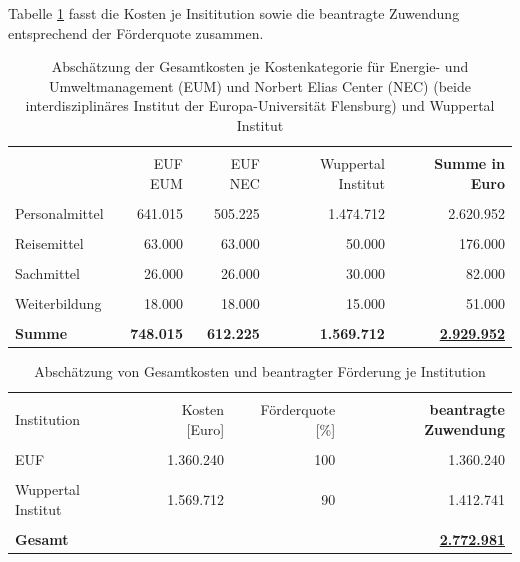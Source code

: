 \documentclass[a4paper,11pt,twoside]{scrartcl}
\begin{document}
Tabelle \ref{tab:kostenkalkulation} fasst die Kosten je Insititution sowie die beantragte Zuwendung entsprechend der Förderquote zusammen.

\begin{table}[h]
\begin{center}
  \caption{Abschätzung der Gesamtkosten je Kostenkategorie für Energie- und Umweltmanagement (EUM) und Norbert Elias Center (NEC) (beide interdisziplinäres Institut der Europa-Universität Flensburg) und Wuppertal Institut}
  
\begin{tabular}[h]{|l | r | r | r | r|}
\hline
&&&&\\
& EUF EUM & EUF NEC & Wuppertal Institut & \textbf{Summe in Euro}\\
\hline
\hline
&&&&\\
 Personalmittel & 641.015 & 505.225 & 1.474.712 & 2.620.952\\
 \hline
 &&&&\\
 Reisemittel & 63.000 & 63.000 & 50.000 & 176.000\\
 \hline
 &&&&\\
 Sachmittel & 26.000 & 26.000 & 30.000 & 82.000\\
 \hline
 &&&&\\
 Weiterbildung & 18.000 & 18.000 & 15.000 & 51.000\\
 \hline
 \hline
 &&&&\\
 \textbf{Summe}& \textbf{748.015} & \textbf{612.225} & \textbf{1.569.712} & \underline{\textbf{2.929.952}}\\
 \hline
 \end{tabular}
 \label{tab:kostenkalkulation}
\end{center}
\end{table}

\begin{table}[h]
\begin{center}
  \caption{Abschätzung von Gesamtkosten und beantragter Förderung je Institution}
\begin{tabular}[h]{|l | r | r | r|}
\hline
&&&\\
Institution & Kosten [Euro] & Förderquote [\%] & \textbf{beantragte Zuwendung}\\
\hline
\hline
 &&&\\
 EUF & 1.360.240 & 100 & 1.360.240\\
 \hline
 &&&\\
 Wuppertal Institut & 1.569.712 & 90 & 1.412.741

\\
 \hline
 \hline
 &&&\\
 \textbf{Gesamt} & & &\underline{\textbf{2.772.981}}\\
 \hline
 \end{tabular}
 \label{tab:kostenkalkulation2}
\end{center}
\end{table}
\end{document}
